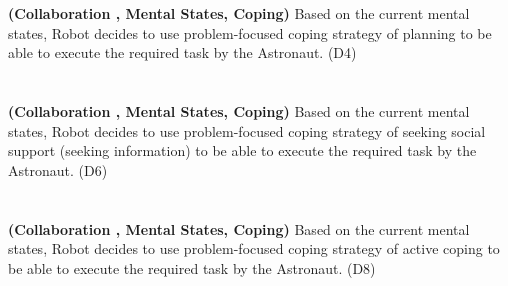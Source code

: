 \noindent\textbf{(Collaboration , Mental States, Coping)} Based on the current
mental states, Robot decides to use problem-focused coping strategy of planning
to be able to execute the required task by the Astronaut. (D4)\\

\noindent{}\\

\noindent{}\\
  
\noindent\textbf{(Collaboration , Mental States, Coping)} Based on the current
mental states, Robot decides to use problem-focused coping strategy of seeking
social support (seeking information) to be able to execute the required task by
the Astronaut. (D6)\\

\noindent{}\\
  
\noindent{}\\
  
\noindent\textbf{(Collaboration , Mental States, Coping)} Based on the current
mental states, Robot decides to use problem-focused coping strategy of active
coping to be able to execute the required task by the Astronaut. (D8)\\

\noindent{}\\
  
